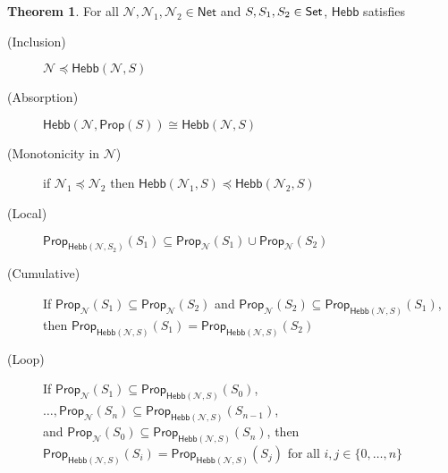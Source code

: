 \documentclass[letterpaper]{article}
\theoremstyle{definition}
\newtheorem{theorem}{Theorem}
\newcommand{\Set}{\mbox{\sf Set}}
\newcommand{\set}[1]{\{ #1 \}}
\newcommand{\Prop}{\textsf{Prop}}
\newcommand{\Inc}{\textsf{Hebb}}
\newcommand{\AllNets}{\mathsf{Net}}
\newcommand{\Net}{\mathcal{N}}
\begin{document}
\begin{theorem}
For all $\Net, \Net_1, \Net_2 \in \AllNets$ and $S, S_1, S_2 \in \Set$, $\Inc$ satisfies
\begin{description}
    \item[(Inclusion)]
    $\Net \preceq \Inc(\Net, S)$
    
    \item[(Absorption)]
    $\Inc(\Net, \Prop(S)) \cong \Inc(\Net, S)$
    
    \item[(Monotonicity in $\Net$)] if ${\Net_1 \preceq \Net_2}$
    then ${\Inc(\Net_1, S) \preceq \Inc(\Net_2, S)}$
    
    \item[(Local)]
    $\Prop_{\Inc(\Net, S_2)}(S_1) \subseteq \Prop_\Net(S_1) \cup \Prop_\Net(S_2)$
    
    \item[(Cumulative)] If ${\Prop_\Net(S_1) \subseteq \Prop_\Net(S_2)}$ and ${\Prop_\Net(S_2) \subseteq \Prop_{\Inc(\Net, S)}(S_1)}$,\\
    then $\Prop_{\Inc(\Net, S)}(S_1) = \Prop_{\Inc(\Net, S)}(S_2)$
    
    \item[(Loop)] If ${\Prop_\Net(S_1) \subseteq \Prop_{\Inc(\Net, S)}(S_0)}$,
    $\ldots, {\Prop_\Net(S_n) \subseteq \Prop_{\Inc(\Net, S)}(S_{n-1})}$,\\
    and 
    ${\Prop_\Net(S_0) \subseteq \Prop_{\Inc(\Net, S)}(S_n)}$,
    then ${\Prop_{\Inc(\Net, S)}(S_i) = \Prop_{\Inc(\Net, S)}(S_j)}$
    for all $i, j \in \set{0, \ldots, n}$
\end{description}
\label{thm:inc-props}
\end{theorem}
\end{document}
